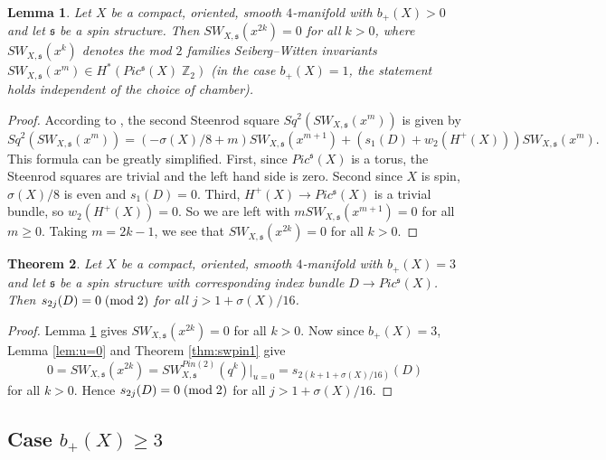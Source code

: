 \documentclass{amsart}
\newtheorem{theorem}{Theorem}[section]
\newtheorem{lemma}[theorem]{Lemma}
\theoremstyle{definition}
\theoremstyle{remark}
\numberwithin{equation}{section}
\begin{document}
\begin{lemma}\label{lem:swx2k}
Let $X$ be a compact, oriented, smooth $4$-manifold with $b_+(X) > 0$ and let $\mathfrak{s}$ be a spin structure. Then $SW_{X,\mathfrak{s}}(x^{2k}) = 0$ for all $k > 0$, where $SW_{X,\mathfrak{s}}(x^k)$ denotes the mod $2$ families Seiberg--Witten invariants $SW_{X,\mathfrak{s}}(x^m) \in H^*( Pic^{\mathfrak{s}}(X) \; \mathbb{Z}_2)$ (in the case $b_+(X) = 1$, the statement holds independent of the choice of chamber).
\end{lemma}
\begin{proof}

According to \cite[Theorem 4.10]{bk}, the second Steenrod square $Sq^2( SW_{X,\mathfrak{s}}(x^m))$ is given by
\[
Sq^2( SW_{X,\mathfrak{s}}(x^m)) = (-\sigma(X)/8 + m)SW_{X,\mathfrak{s}}(x^{m+1}) + (s_1(D) + w_2(H^+(X))) SW_{X,\mathfrak{s}}(x^m).
\]
This formula can be greatly simplified. First, since $Pic^{\mathfrak{s}}(X)$ is a torus, the Steenrod squares are trivial and the left hand side is zero. Second since $X$ is spin, $\sigma(X)/8$ is even and $s_1(D) = 0$. Third, $H^+(X) \to Pic^{\mathfrak{s}}(X)$ is a trivial bundle, so $w_2(H^+(X)) = 0$. So we are left with $m SW_{X , \mathfrak{s} }( x^{m+1} ) = 0$ for all $m \ge 0$. Taking $m=2k-1$, we see that $SW_{X,\mathfrak{s}}(x^{2k}) = 0$ for all $k > 0$.

\end{proof}


\begin{theorem}\label{thm:b+3}
Let $X$ be a compact, oriented, smooth $4$-manifold with $b_+(X) = 3$ and let $\mathfrak{s}$ be a spin structure with corresponding index bundle $D \to Pic^{\mathfrak{s}}(X)$. Then $s_{2j}(D) = 0 \; ({\rm mod} \; 2)$ for all $j > 1+\sigma(X)/16$.
\end{theorem}
\begin{proof}
Lemma \ref{lem:swx2k} gives $SW_{X,\mathfrak{s}}(x^{2k}) = 0$ for all $k > 0$. Now since $b_+(X) = 3$, Lemma \ref{lem:u=0} and Theorem \ref{thm:swpin1} give
\[
0 = SW_{X,\mathfrak{s}}(x^{2k}) = SW^{Pin(2)}_{X,\mathfrak{s}}( q^k )|_{u=0} = s_{2(k+1+\sigma(X)/16)}(D)
\]
for all $k > 0$. Hence $s_{2j}(D) = 0 \; ({\rm mod} \; 2)$ for all $j > 1+\sigma(X)/16$.

\end{proof}

\subsection{Case $b_+(X) \ge 3$}\label{sec:b+3}
\end{document}
